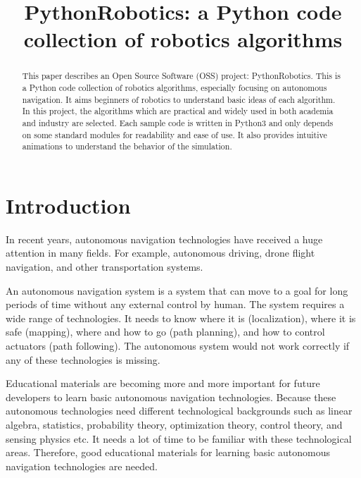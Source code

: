 \documentclass{bmvc2k}
\title{PythonRobotics: a Python code collection of robotics algorithms}
\begin{document}
\maketitle

\begin{abstract}
This paper describes an Open Source Software (OSS) project: PythonRobotics\cite{github}.
This is a Python code collection of robotics algorithms, especially focusing on autonomous navigation.
It aims beginners of robotics to understand basic ideas of each algorithm.
In this project, the algorithms which are practical and widely used in both academia and industry are selected.
Each sample code is written in Python3 and only depends on some standard modules for readability and ease of use.
It also provides intuitive animations to understand the behavior of the simulation.

\end{abstract}

\section{Introduction}

In recent years, autonomous navigation technologies have received a huge attention in many fields. 
For example, autonomous driving\cite{pathplanning}, drone flight navigation, and other transportation systems.

An autonomous navigation system is a system that can move to a goal for long periods of time without any external control by human.
The system requires a wide range of technologies.
It needs to know where it is (localization), where it is safe (mapping), where and how to go (path planning), and how to control actuators (path following). 
The autonomous system would not work correctly if any of these technologies is missing.

Educational materials are becoming more and more important for future developers to learn basic autonomous navigation technologies.
Because these autonomous technologies need different technological backgrounds such as linear algebra, statistics, probability theory, optimization theory, control theory, and sensing physics etc. 
It needs a lot of time to be familiar with these technological areas.
Therefore, good educational materials for learning basic autonomous navigation technologies are needed.
\end{document}
